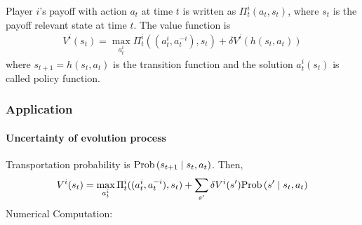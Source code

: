 \documentclass[11pt]{elegantbook}
\begin{document}
Player $i$'s payoff with action $a_t$ at time $t$ is written as $\Pi_t^i(a_t,s_t)$, where $s_t$ is the payoff relevant state at time $t$. The value function is
\begin{equation}
    \begin{aligned}
        V^i(s_t)=\max_{a^i_t}\Pi_t^i((a^i_t,a^{-i}_t),s_t)+\delta V^i(h(s_t,a_t))
    \end{aligned}
    \nonumber
\end{equation}
where $s_{t+1}=h(s_t,a_t)$ is the transition function and the solution $a^i_t(s_t)$ is called policy function.

\subsubsection*{Application}
\paragraph*{Uncertainty of evolution process}
Transportation probability is $\textnormal{Prob}\left(s_{t+1}\mid s_t,a_t\right)$. Then,
\begin{equation}
    \begin{aligned}
        V^i(s_t)=\max_{a^i_t}\Pi_t^i((a^i_t,a^{-i}_t),s_t)+\sum_{s'}\delta V^i(s')\textnormal{Prob}\left(s'\mid s_t,a_t\right)
    \end{aligned}
    \nonumber
\end{equation}
Numerical Computation:
\end{document}

